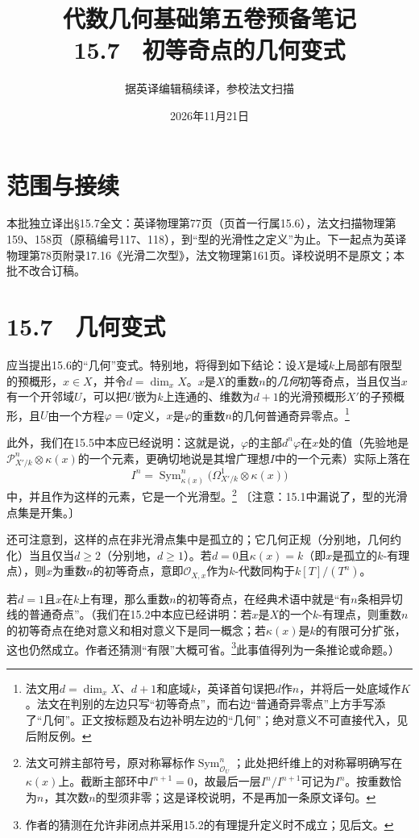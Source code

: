 \documentclass[openany,fontset=fandol]{ctexbook}
\newcommand{\OO}{\mathcal O}
\DeclareMathOperator{\Sym}{Sym}
\begin{document}
\title{代数几何基础第五卷预备笔记\\15.7　初等奇点的几何变式}
\author{据英译编辑稿续译，参校法文扫描}
\date{2026年11月21日}
\maketitle
\chapter*{范围与接续}
本批独立译出§15.7全文：英译物理第77页（页首一行属15.6），法文扫描物理第159、158页（原稿编号117、118），到“型的光滑性之定义”为止。下一起点为英译物理第78页附录17.16《光滑二次型》，法文物理第161页。译校说明不是原文；本批不改合订稿。
\chapter*{15.7　几何变式}
应当提出15.6的“几何”变式。特别地，将得到如下结论：设$X$是域$k$上局部有限型的预概形，$x\in X$，并令$d=\dim_x X$。$x$是$X$的重数$n$的\emph{几何}初等奇点，当且仅当$x$有一个开邻域$U$，可以把$U$嵌为$k$上连通的、维数为$d+1$的光滑预概形$X'$的子预概形，且$U$由一个方程$\varphi=0$定义，$x$是$\varphi$的重数$n$的几何普通奇异零点。\footnote{法文用$d=\dim_x X$、$d+1$和底域$k$，英译首句误把$d$作$n$，并将后一处底域作$K$。法文在判别的左边只写“初等奇点”，而右边“普通奇异零点”上方手写添了“几何”。正文按标题及右边补明左边的“几何”；绝对意义不可直接代入，见后附反例。}

此外，我们在15.5中本应已经说明：这就是说，$\varphi$的主部$d^n\varphi$在$x$处的值（先验地是$\mathcal P^n_{X'/k}\otimes\kappa(x)$的一个元素，更确切地说是其增广理想$I$中的一个元素）实际上落在
\[
I^n=\Sym^n_{\kappa(x)}
\bigl(\Omega^1_{X'/k}\otimes\kappa(x)\bigr)
\]
中，并且作为这样的元素，它是一个光滑型。\footnote{法文可辨主部符号，原对称幂标作$\Sym^n_{\OO_U}$；此处把纤维上的对称幂明确写在$\kappa(x)$上。截断主部环中$I^{n+1}=0$，故最后一层$I^n/I^{n+1}$可记为$I^n$。按重数恰为$n$，其次数$n$的型须非零；这是译校说明，不是再加一条原文译句。}
〔注意：15.1中漏说了，型的光滑点集是开集。〕

还可注意到，这样的点在非光滑点集中是孤立的；它几何正规（分别地，几何约化）当且仅当$d\ge2$（分别地，$d\ge1$）。若$d=0$且$\kappa(x)=k$（即$x$是孤立的$k$-有理点），则$x$为重数$n$的初等奇点，意即$\OO_{X,x}$作为$k$-代数同构于$k[T]/(T^n)$。

\newpage
若$d=1$且$x$在$k$上有理，那么重数$n$的初等奇点，在经典术语中就是“有$n$条相异切线的普通奇点”。（我们在15.2中本应已经讲明：若$x$是$X$的一个$k$-有理点，则重数$n$的初等奇点在绝对意义和相对意义下是同一概念；若$\kappa(x)$是$k$的有限可分扩张，这也仍然成立。作者还猜测“有限”大概可省。\footnote{作者的猜测在允许非闭点并采用15.2的有理提升定义时不成立；见后文。}此事值得列为一条推论或命题。）
\end{document}
